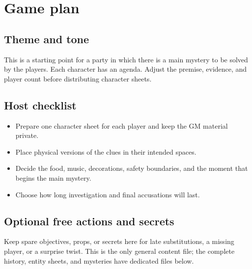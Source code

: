 \section{Game plan}


\subsection{Theme and tone}
This is a starting point for a party in which there is a main mystery to be solved by the players. Each character has an agenda. Adjust the premise, evidence, and player count before distributing character sheets.

\subsection{Host checklist}
\begin{itemize}
  \item Prepare one character sheet for each player and keep the GM material private.
  \item Place physical versions of the clues in their intended spaces.
  \item Decide the food, music, decorations, safety boundaries, and the moment that begins the main mystery.
  \item Choose how long investigation and final accusations will last.
\end{itemize}


\subsection{Optional free actions and secrets}
Keep spare objectives, props, or secrets here for late substitutions, a missing player, or a surprise twist. This is the only general content file; the complete history, entity sheets, and mysteries have dedicated files below.
